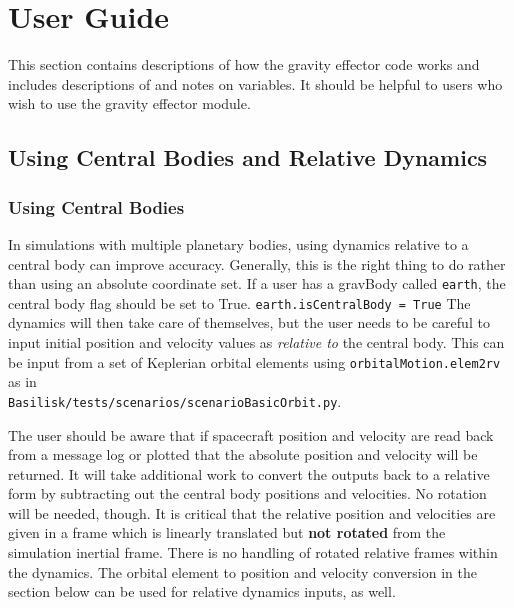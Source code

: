 \section{User Guide}
This section contains descriptions of how the gravity effector code works and includes descriptions of and notes on variables. It should be helpful to users who wish to use the gravity effector module.

\subsection{Using Central Bodies and Relative Dynamics}
\subsubsection{Using Central Bodies}
In simulations with multiple planetary bodies, using dynamics relative to a central body can improve accuracy. Generally, this is the right thing to do rather than using an absolute coordinate set. If a user has a gravBody called \verb|earth|, the central body flag should be set to True.
\verb|earth.isCentralBody = True|
The dynamics will then take care of themselves, but the user needs to be careful to input initial position and velocity values as \textit{relative to} the central body. This can be input from a set of Keplerian orbital elements using \verb|orbitalMotion.elem2rv| as in\\ \verb|Basilisk/tests/scenarios/scenarioBasicOrbit.py|.

The user should be aware that if spacecraft position and velocity are read back from a message log or plotted that the absolute position and velocity will be returned. It will take additional work to convert the outputs back to a relative form by subtracting out the central body positions and velocities. No rotation will be needed, though.
It is critical that the relative position and velocities are given in a frame which is linearly translated but \textbf{not rotated} from the simulation inertial frame. There is no handling of rotated relative frames within the dynamics. The orbital element to position and velocity conversion in the section below can be used for relative dynamics inputs, as well.


